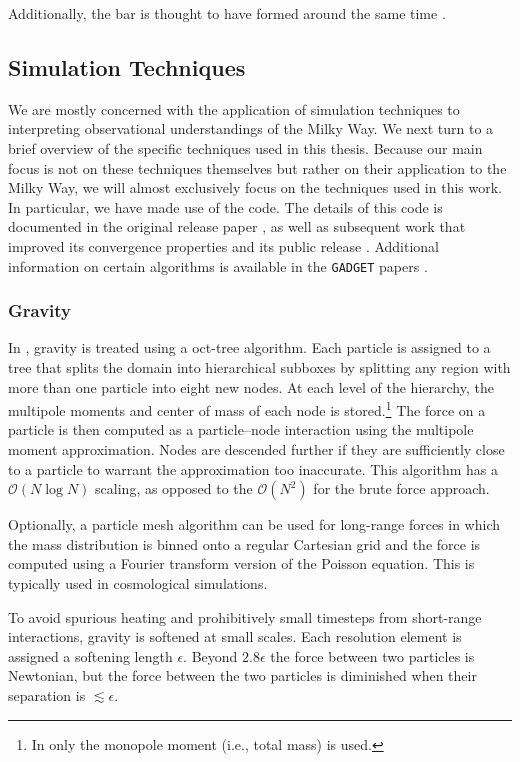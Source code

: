 Additionally, the bar is thought to have formed around the same time \citep{2019MNRAS.490.4740B,2024MNRAS.530.2972S}.

\subsection{Simulation Techniques}
We are mostly concerned with the application of simulation techniques to interpreting observational understandings of the Milky Way. We next turn to a brief overview of the specific techniques used in this thesis. Because our main focus is not on these techniques themselves but rather on their application to the Milky Way, we will almost exclusively focus on the techniques used in this work. In particular, we have made use of the \AREPO{} code. The details of this code is documented in the original release paper \citep{2010MNRAS.401..791S}, as well as subsequent work that improved its convergence properties and its public release \citep{2016MNRAS.455.1134P,2020ApJS..248...32W}. Additional information on certain algorithms is available in the \texttt{GADGET} papers \citep{2001NewA....6...79S,2005MNRAS.364.1105S,2021MNRAS.506.2871S}.

\subsubsection{Gravity}
In \AREPO{}, gravity is treated using a \citet{1986Natur.324..446B} oct-tree algorithm. Each particle is assigned to a tree that splits the domain into hierarchical subboxes by splitting any region with more than one particle into eight new nodes. At each level of the hierarchy, the multipole moments and center of mass of each node is stored.\footnote{In \AREPO{} only the monopole moment (i.e., total mass) is used.} The force on a particle is then computed as a particle--node interaction using the multipole moment approximation. Nodes are descended further if they are sufficiently close to a particle to warrant the approximation too inaccurate. This algorithm has a $\mathcal{O}\left(N \log{N}\right)$ scaling, as opposed to the $\mathcal{O}\left(N^2\right)$ for the brute force approach.

Optionally, a particle mesh algorithm can be used for long-range forces in which the mass distribution is binned onto a regular Cartesian grid and the force is computed using a Fourier transform version of the Poisson equation. This is typically used in cosmological simulations.

To avoid spurious heating and prohibitively small timesteps from short-range interactions, gravity is softened at small scales. Each resolution element is assigned a softening length $\epsilon$. Beyond $2.8\epsilon$ the force between two particles is Newtonian, but the force between the two particles is diminished when their separation is $\lesssim\epsilon$.

